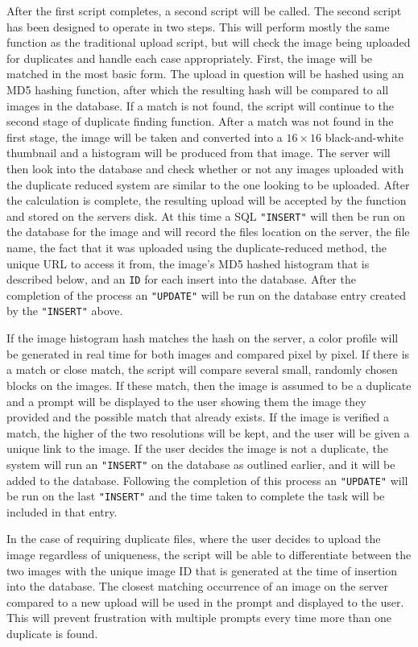 \documentclass[11pt]{article}
\begin{document}
After the first script completes, a second script will be called. The second script has been designed to operate in two steps. This will perform mostly the same function as the traditional upload script, but will check the image being uploaded for duplicates and handle each case appropriately. First, the image will be matched in the most basic form. The upload in question will be hashed using an MD5 hashing function, after which the resulting hash will be compared to all images in the database. If a match is not found, the script will continue to the second stage of duplicate finding function. After a match was not found in the first stage, the image will be taken and converted into a $16\times 16$ black-and-white thumbnail and a histogram will be produced from that image. The server will then look into the database and check whether or not any images uploaded with the duplicate reduced system are similar to the one looking to be uploaded. After the calculation is complete, the resulting  upload will be accepted by the function and stored on the servers disk. At this time a SQL {\tt "INSERT"} will then be run on the database for the image and will record the files location on the server, the file name, the fact that it was uploaded using the duplicate-reduced method, the unique URL to access it from, the image's MD5 hashed histogram that is described below, and an {\tt ID} for each insert into the database. After the completion of the process an {\tt "UPDATE"} will be run on the database entry created by the {\tt "INSERT"} above.

If the image histogram hash matches the hash on the server, a color profile will be generated in real time for both images and compared pixel by pixel. If there is a match or close match, the script will compare several small, randomly chosen blocks on the images. If these match, then the image is assumed to be a duplicate and a prompt will be displayed to the user showing them the image they provided and the possible match that already exists. If the image is verified a match, the higher of the two resolutions will be kept, and the user will be given a unique link to the image. If the user decides the image is not a duplicate, the system will run an {\tt "INSERT"} on the database as outlined earlier, and it will be added to the database. Following the completion of this process an {\tt "UPDATE"} will be run on the last {\tt "INSERT"} and the time taken to complete the task will be included in that entry.

In the case of requiring duplicate files, where the user decides to upload the image regardless of uniqueness, the script will be able to differentiate between the two images with the unique image ID that is generated at the time of insertion into the database. The closest matching occurrence of an image on the server compared to a new upload will be used in the prompt and displayed to the user. This will prevent frustration with multiple prompts every time more than one duplicate is found.
\end{document}
